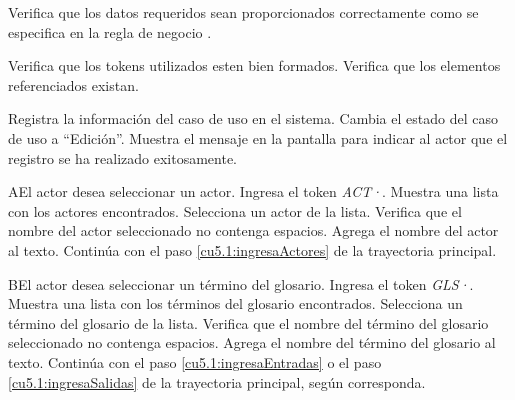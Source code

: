 \begin{UCtrayectoria}
    \UCpaso[\UCsist] Verifica que los datos requeridos sean proporcionados correctamente como se especifica en la regla de negocio .  
    
    \UCpaso[\UCsist] Verifica que los tokens utilizados esten bien formados. 
    \UCpaso[\UCsist] Verifica que los elementos referenciados existan. 
    
    \UCpaso[\UCsist] Registra la información del caso de uso en el sistema.
    \UCpaso[\UCsist] Cambia el estado del caso de uso a ``Edición''.
    \UCpaso[\UCsist] Muestra el mensaje  en la pantalla  
    para indicar al actor que el registro se ha realizado exitosamente.
 \end{UCtrayectoria}
 
 \begin{UCtrayectoriaA}{A}{El actor desea seleccionar un actor.}
 	\UCpaso[\UCactor] Ingresa el token {\it ACT·}.
 	\UCpaso[\UCsist] Muestra una lista con los actores encontrados.
 	\UCpaso[\UCactor] Selecciona un actor de la lista.
  	\UCpaso[\UCsist] Verifica que el nombre del actor seleccionado no contenga espacios. 
  	\UCpaso[\UCsist] Agrega el nombre del actor al texto.
    \UCpaso[] Continúa con el paso \ref{cu5.1:ingresaActores} de la trayectoria principal.
 \end{UCtrayectoriaA}
 \begin{UCtrayectoriaA}{B}{El actor desea seleccionar un término del glosario.}
 	\UCpaso[\UCactor] Ingresa el token {\it GLS·}.	
 	\UCpaso[\UCsist] Muestra una lista con los términos del glosario encontrados.
 	\UCpaso[\UCactor] Selecciona un término del glosario de la lista.
  	\UCpaso[\UCsist] Verifica que el nombre del término del glosario seleccionado no contenga espacios. 
  	\UCpaso[\UCsist] Agrega el nombre del término del glosario al texto.
    \UCpaso[] Continúa con el paso \ref{cu5.1:ingresaEntradas} o el paso \ref{cu5.1:ingresaSalidas} de la trayectoria principal, según corresponda.
 \end{UCtrayectoriaA}

